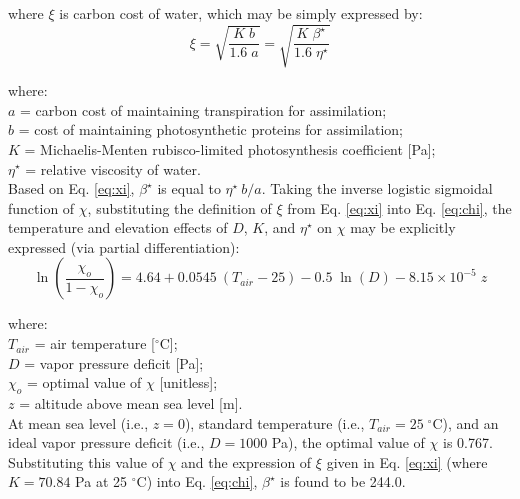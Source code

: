 \noindent where $\xi$ is carbon cost of water, which may be simply expressed by:
%
\begin{equation}
\label{eq:xi}
    \xi = \sqrt{\frac{K\; b}{1.6\; a}} = \sqrt{\frac{K\; \beta^\star}{1.6\; \eta^\star}}
\end{equation}

\noindent where:\\
\indent $a$ = carbon cost of maintaining transpiration for assimilation; \\
\indent $b$ = cost of maintaining photosynthetic proteins for assimilation;\\
\indent $K$ = Michaelis-Menten rubisco-limited photosynthesis coefficient [Pa];\\
\indent $\eta^\star$ = relative viscosity of water.\\

Based on Eq. \ref{eq:xi}, $\beta^\star$ is equal to $\eta^\star\: b/a$.
Taking the inverse logistic sigmoidal function of $\chi$, substituting the definition of $\xi$ from Eq. \ref{eq:xi} into Eq. \ref{eq:chi}, the temperature and elevation effects of $D$, $K$, and $\eta^\star$ on $\chi$ may be explicitly expressed (via partial differentiation):
\begin{equation}
\label{eq:whe}
    \ln \left(\frac{\chi_o}{1 - \chi_o}\right) = 4.64 + 
    	0.0545\: \left(T_{air} - 25\right) - 
    	0.5\; \ln (D) - 
    	8.15\times 10^{-5}\; z
\end{equation}

\noindent where:\\
\indent $T_{air}$ = air temperature [${}^\circ$C];\\
\indent $D$ = vapor pressure deficit [Pa];\\
\indent $\chi_o$ = optimal value of $\chi$ [unitless];\\
\indent $z$ = altitude above mean sea level [m].\\

\noindent At mean sea level (i.e., $z = 0$), standard temperature (i.e., $T_{air} = 25\;{}^\circ$C), and an ideal vapor pressure deficit (i.e., $D = 1000$ Pa), the optimal value of $\chi$ is 0.767. Substituting this value of $\chi$ and the expression of $\xi$ given in Eq. \ref{eq:xi} (where $K = 70.84$ Pa at 25 ${}^\circ$C) into Eq. \ref{eq:chi}, $\beta^\star$ is found to be 244.0. 

